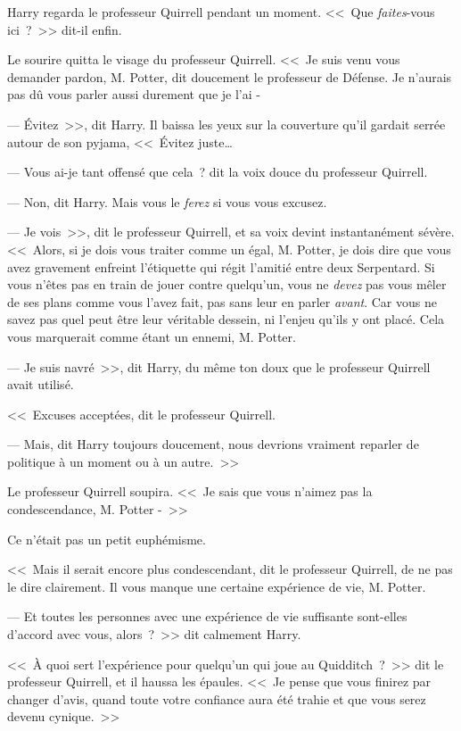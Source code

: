 Harry regarda le professeur Quirrell pendant un moment. <<~Que \emph{faites}-vous ici~?~>> dit-il enfin.

Le sourire quitta le visage du professeur Quirrell. <<~Je suis venu vous demander pardon, M. Potter, dit doucement le professeur de Défense. Je n'aurais pas dû vous parler aussi durement que je l'ai -

--- Évitez~>>, dit Harry. Il baissa les yeux sur la couverture qu'il gardait serrée autour de son pyjama, <<~Évitez juste…

--- Vous ai-je tant offensé que cela~? dit la voix douce du professeur Quirrell.

--- Non, dit Harry. Mais vous le \emph{ferez} si vous vous excusez.

--- Je vois~>>, dit le professeur Quirrell, et sa voix devint instantanément sévère. <<~Alors, si je dois vous traiter comme un égal, M. Potter, je dois dire que vous avez gravement enfreint l'étiquette qui régit l'amitié entre deux Serpentard. Si vous n'êtes pas en train de jouer contre quelqu'un, vous ne \emph{devez} pas vous mêler de ses plans comme vous l'avez fait, pas sans leur en parler \emph{avant}. Car vous ne savez pas quel peut être leur véritable dessein, ni l'enjeu qu'ils y ont placé. Cela vous marquerait comme étant un ennemi, M. Potter.

--- Je suis navré~>>, dit Harry, du même ton doux que le professeur Quirrell avait utilisé.

<<~Excuses acceptées, dit le professeur Quirrell.

--- Mais, dit Harry toujours doucement, nous devrions vraiment reparler de politique à un moment ou à un autre.~>>

Le professeur Quirrell soupira. <<~Je sais que vous n'aimez pas la condescendance, M. Potter -~>>

Ce n'était pas un petit euphémisme.

<<~Mais il serait encore plus condescendant, dit le professeur Quirrell, de ne pas le dire clairement. Il vous manque une certaine expérience de vie, M. Potter.

--- Et toutes les personnes avec une expérience de vie suffisante sont-elles d'accord avec vous, alors~?~>> dit calmement Harry.

<<~À quoi sert l'expérience pour quelqu'un qui joue au Quidditch~?~>> dit le professeur Quirrell, et il haussa les épaules. <<~Je pense que vous finirez par changer d'avis, quand toute votre confiance aura été trahie et que vous serez devenu cynique.~>>

